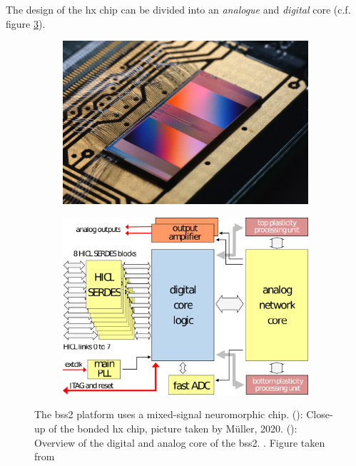 The design of the \gls{hx} chip can be divided into an \emph{analogue} and \emph{digital} core (c.f. figure \ref{hxstructure}). 
\begin{figure}
	\begin{subfigure}[c]{0.5\textwidth}
		\centering
		\caption{}
		\includegraphics[width=\textwidth]{figures/HXcloseup.JPG}
		\label{hxcloseup}
	\end{subfigure}	
	\begin{subfigure}[c]{0.5\textwidth}
		\centering
		\caption{}
		\includegraphics[width=\textwidth]{figures/g3418.png}
		\label{hxstructure}
	\end{subfigure}
	\caption{The \gls{bss2} platform uses a mixed-signal neuromorphic chip. (): Close-up of the bonded \gls{hx} chip, picture taken by Müller, 2020. (): Overview of the digital and analog core of the \gls{bss2}.   . Figure taken from \cite{schemmel2017nmda}}
\end{figure}

